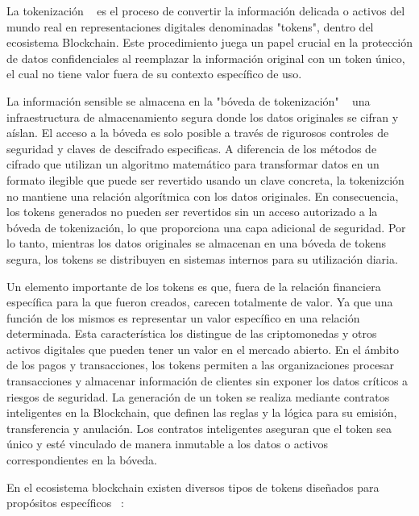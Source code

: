 La tokenización ~\cite{tokenización} es el proceso de convertir la información delicada o activos del mundo real en representaciones digitales denominadas "tokens", dentro del ecosistema Blockchain.
Este procedimiento juega un papel crucial en la protección de datos confidenciales al reemplazar la información original con un token único, el cual no tiene valor fuera de su contexto específico de uso.

La información sensible se almacena en la "bóveda de tokenización" ~\cite{bóvedaTokenización} una infraestructura de almacenamiento segura donde los datos originales se cifran y aíslan. El acceso a la bóveda es solo posible a través de rigurosos controles de seguridad y claves de descifrado especificas.
A diferencia de los métodos de cifrado que utilizan un algoritmo matemático para transformar datos en un formato ilegible que puede ser revertido usando un clave concreta, la tokenizción no mantiene una relación algorítmica con los datos originales. En consecuencia, los tokens generados no pueden ser revertidos sin un acceso autorizado a la bóveda de tokenización, lo que proporciona una capa adicional de seguridad.
Por lo tanto, mientras los datos originales se almacenan en una bóveda de tokens segura, los tokens se distribuyen en sistemas internos para su utilización diaria.

Un elemento importante de los tokens es que, fuera de la relación financiera específica para la que fueron creados, carecen totalmente de valor. Ya que una función de los mismos es representar un valor específico en una relación determinada. Esta característica los distingue de las criptomonedas y otros activos digitales que pueden tener un valor en el mercado abierto.
En el ámbito de los pagos y transacciones, los tokens permiten a las organizaciones procesar transacciones y almacenar información de clientes sin exponer los datos críticos a riesgos de seguridad.
La generación de un token se realiza mediante contratos inteligentes en la Blockchain, que definen las reglas y la lógica para su emisión, transferencia y anulación. Los contratos inteligentes aseguran que el token sea único y esté vinculado de manera inmutable a los datos o activos correspondientes en la bóveda.

En el ecosistema blockchain existen diversos tipos de tokens diseñados para propósitos específicos~\cite{tiposToken} :

